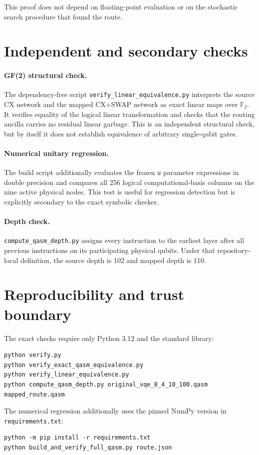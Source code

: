 \documentclass[11pt]{article}
\begin{document}
This proof does not depend on floating-point evaluation or on the stochastic
search procedure that found the route.

\section{Independent and secondary checks}

\paragraph{GF(2) structural check.}
The dependency-free script \texttt{verify\_linear\_equivalence.py} interprets
the source CX network and the mapped CX+SWAP network as exact linear maps over
\(\mathbb{F}_2\).  It verifies equality of the logical linear transformation
and checks that the routing ancilla carries no residual linear garbage.  This
is an independent structural check, but by itself it does not establish
equivalence of arbitrary single-qubit gates.

\paragraph{Numerical unitary regression.}
The build script additionally evaluates the frozen \texttt{u} parameter
expressions in double precision and compares all 256 logical
computational-basis columns on the nine active physical nodes.  This test is
useful for regression detection but is explicitly secondary to the exact
symbolic checker.

\paragraph{Depth check.}
\texttt{compute\_qasm\_depth.py} assigns every instruction to the earliest
layer after all previous instructions on its participating physical qubits.
Under that repository-local definition, the source depth is 102 and mapped
depth is 110.

\section{Reproducibility and trust boundary}

The exact checks require only Python 3.12 and the standard library:
\begin{verbatim}
python verify.py
python verify_exact_qasm_equivalence.py
python verify_linear_equivalence.py
python compute_qasm_depth.py original_vqe_8_4_10_100.qasm mapped_route.qasm
\end{verbatim}
The numerical regression additionally uses the pinned NumPy version in
\texttt{requirements.txt}:
\begin{verbatim}
python -m pip install -r requirements.txt
python build_and_verify_full_qasm.py route.json
\end{verbatim}
\end{document}
